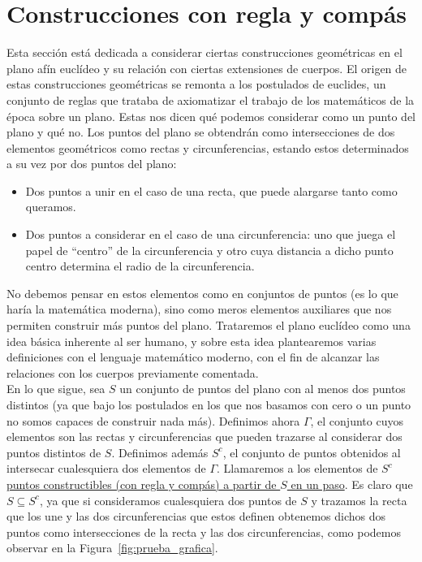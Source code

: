 \section{Construcciones con regla y compás}
Esta sección está dedicada a considerar ciertas construcciones geométricas en el plano afín euclídeo y su relación con ciertas extensiones de cuerpos. El origen de estas construcciones geométricas se remonta a los postulados de euclides, un conjunto de reglas que trataba de axiomatizar el trabajo de los matemáticos de la época sobre un plano. Estas nos dicen qué podemos considerar como un punto del plano y qué no. Los puntos del plano se obtendrán como intersecciones de dos elementos geométricos como rectas y circunferencias, estando estos determinados a su vez por dos puntos del plano:
\begin{itemize}
    \item Dos puntos a unir en el caso de una recta, que puede alargarse tanto como queramos.
    \item Dos puntos a considerar en el caso de una circunferencia: uno que juega el papel de ``centro'' de la circunferencia y otro cuya distancia a dicho punto centro determina el radio de la circunferencia.
\end{itemize}
No debemos pensar en estos elementos como en conjuntos de puntos (es lo que haría la matemática moderna), sino como meros elementos auxiliares que nos permiten construir más puntos del plano. Trataremos el plano euclídeo como una idea básica inherente al ser humano, y sobre esta idea plantearemos varias definiciones con el lenguaje matemático moderno, con el fin de alcanzar las relaciones con los cuerpos previamente comentada.\\

\noindent
En lo que sigue, sea $S$ un conjunto de puntos del plano con al menos dos puntos distintos (ya que bajo los postulados en los que nos basamos con cero o un punto no somos capaces de construir nada más). Definimos ahora $\Gamma$, el conjunto cuyos elementos son las rectas y circunferencias que pueden trazarse al considerar dos puntos distintos de $S$. Definimos además $S^c$, el conjunto de puntos obtenidos al intersecar cualesquiera dos elementos de $\Gamma$. Llamaremos a los elementos de $S^c$ \underline{puntos constructibles (con regla y compás) a partir de $S$ en un paso}. Es claro que $S\subseteq S^c$, ya que si consideramos cualesquiera dos puntos de $S$ y trazamos la recta que los une y las dos circunferencias que estos definen obtenemos dichos dos puntos como intersecciones de la recta y las dos circunferencias, como podemos observar en la Figura~\ref{fig:prueba_grafica}.

